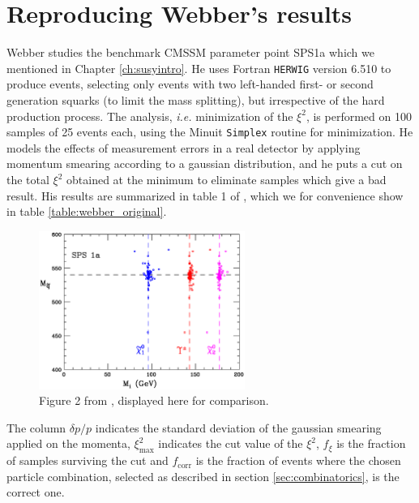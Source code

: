 \documentclass[twoside,english]{uiofysmaster}
\begin{document}
\section{Reproducing Webber's results}
Webber studies the benchmark CMSSM parameter point SPS1a \cite{Allanach:2002nj} which we mentioned in Chapter \ref{ch:susyintro}. He uses Fortran {\tt HERWIG} version 6.510 \cite{Corcella:2000bw,Moretti:2002eu} to produce events, selecting only events with two left-handed first- or second generation squarks (to limit the mass splitting), but irrespective of the hard production process. The analysis, {\it i.e.} minimization of the $\xi^2$, is performed on 100 samples of 25 events each, using the Minuit {\tt Simplex} \cite{James:1975dr} routine for minimization. He models the effects of measurement errors in a real detector by applying momentum smearing according to a gaussian distribution, and he puts a cut on the total $\xi^2$ obtained at the minimum to eliminate samples which give a bad result. His results are summarized in table 1 of \cite{Webber:2009vm}, which we for convenience show in table \ref{table:webber_original}. 
\begin{figure}[hbt]
	\centering
	\includegraphics[width=0.6\textwidth]{figures/webber_rec_table/sps1a_fits.eps} 
	\caption{Figure 2 from \cite{Webber:2009vm}, displayed here for comparison.}
	\label{fig:webber_scatter}
\end{figure}
The column $\delta p/p$ indicates the standard deviation of the gaussian smearing applied on the momenta, $\xi^2_\mathrm{max}$ indicates the cut value of the $\xi^2$, $f_\xi$ is the fraction of samples surviving the cut and $f_\mathrm{corr}$ is the fraction of events where the chosen particle combination, selected as described in section \ref{sec:combinatorics}, is the correct one. 
\end{document}
